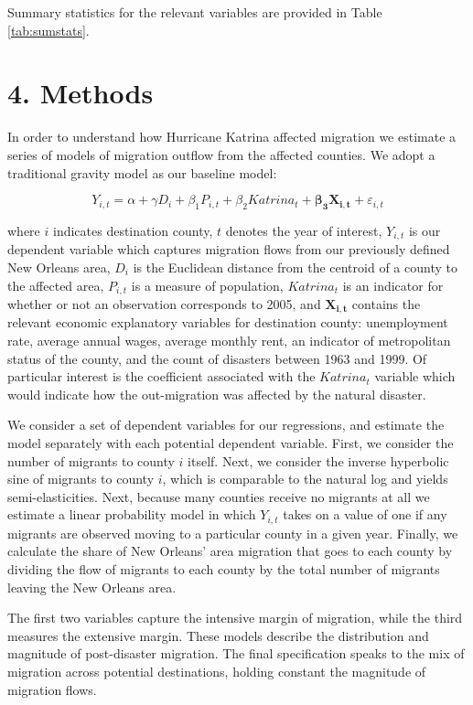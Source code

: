 \documentclass[]{article}
\begin{document}
Summary statistics for the relevant variables are provided in Table
\ref{tab:sumstats}.

\section{4. Methods}\label{methods}

In order to understand how Hurricane Katrina affected migration we
estimate a series of models of migration outflow from the affected
counties. We adopt a traditional gravity model as our baseline model:

\[ Y_{i,t} = \alpha + \gamma {D}_{i} + \beta_1 {P}_{i,t} + \beta_2 {Katrina}_{t} + \mathbf{\beta_3} \mathbf{X_{i,t}} + \varepsilon_{i,t} \label{eq:basereg} \]

where \(i\) indicates destination county, \(t\) denotes the year of
interest, \(Y_{i,t}\) is our dependent variable which captures migration
flows from our previously defined New Orleans area, \({D}_{i}\) is the
Euclidean distance from the centroid of a county to the affected area,
\({P}_{i,t}\) is a measure of population, \({Katrina}_{t}\) is an
indicator for whether or not an observation corresponds to 2005, and
\(\mathbf{X_{i,t}}\) contains the relevant economic explanatory
variables for destination county: unemployment rate, average annual
wages, average monthly rent, an indicator of metropolitan status of the
county, and the count of disasters between 1963 and 1999. Of particular
interest is the coefficient associated with the \({Katrina}_{t}\)
variable which would indicate how the out-migration was affected by the
natural disaster.

We consider a set of dependent variables for our regressions, and
estimate the model separately with each potential dependent variable.
First, we consider the number of migrants to county \(i\) itself. Next,
we consider the inverse hyperbolic sine of migrants to county \(i\),
which is comparable to the natural log and yields semi-elasticities.
Next, because many counties receive no migrants at all we estimate a
linear probability model in which \(Y_{i,t}\) takes on a value of one if
any migrants are observed moving to a particular county in a given year.
Finally, we calculate the share of New Orleans' area migration that goes
to each county by dividing the flow of migrants to each county by the
total number of migrants leaving the New Orleans area.

The first two variables capture the intensive margin of migration, while
the third measures the extensive margin. These models describe the
distribution and magnitude of post-disaster migration. The final
specification speaks to the mix of migration across potential
destinations, holding constant the magnitude of migration flows.
\end{document}
